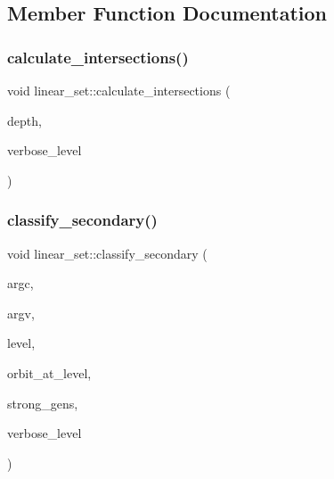 \subsection{Member Function Documentation}
\mbox{\label{classlinear__set_a6afc3349a7aa487d8f716ee7e7ad4b23}} 
\subsubsection{\texorpdfstring{calculate\+\_\+intersections()}{calculate\_intersections()}}
{\footnotesize\ttfamily void linear\+\_\+set\+::calculate\+\_\+intersections (\begin{DoxyParamCaption}\item[{\mbox{\hyperlink{galois_8h_a09fddde158a3a20bd2dcadb609de11dc}{I\+NT}}}]{depth,  }\item[{\mbox{\hyperlink{galois_8h_a09fddde158a3a20bd2dcadb609de11dc}{I\+NT}}}]{verbose\+\_\+level }\end{DoxyParamCaption})}

\mbox{\label{classlinear__set_a5d7659de855e20e2fa8e41e7aedcb1fc}} 
\subsubsection{\texorpdfstring{classify\+\_\+secondary()}{classify\_secondary()}}
{\footnotesize\ttfamily void linear\+\_\+set\+::classify\+\_\+secondary (\begin{DoxyParamCaption}\item[{int}]{argc,  }\item[{const char $\ast$$\ast$}]{argv,  }\item[{\mbox{\hyperlink{galois_8h_a09fddde158a3a20bd2dcadb609de11dc}{I\+NT}}}]{level,  }\item[{\mbox{\hyperlink{galois_8h_a09fddde158a3a20bd2dcadb609de11dc}{I\+NT}}}]{orbit\+\_\+at\+\_\+level,  }\item[{\mbox{\hyperlink{classstrong__generators}{strong\+\_\+generators}} $\ast$}]{strong\+\_\+gens,  }\item[{\mbox{\hyperlink{galois_8h_a09fddde158a3a20bd2dcadb609de11dc}{I\+NT}}}]{verbose\+\_\+level }\end{DoxyParamCaption})}

